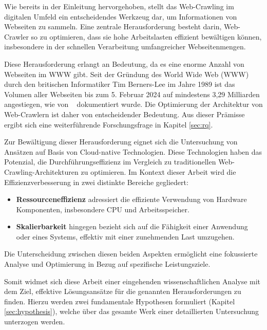 Wie bereits in der Einleitung hervorgehoben, stellt das Web-Crawling im digitalen Umfeld ein entscheidendes Werkzeug dar, um Informationen von Webseiten zu sammeln.
Eine zentrale Herausforderung besteht darin, Web-Crawler so zu optimieren, dass sie hohe Arbeitslasten effizient bewältigen können, insbesondere in der schnellen Verarbeitung umfangreicher Webseitenmengen.



Diese Herausforderung erlangt an Bedeutung, da es eine enorme Anzahl von Webseiten im \ac{WWW} gibt. Seit der Gründung des World Wide Web (\ac{WWW}) durch den britischen Informatiker Tim Berners-Lee im Jahre 1989 ist das Volumen aller Webseiten bis zum 5. Februar 2024 auf mindestens 3,29 Milliarden angestiegen, wie von ~\parencite[vgl.][]{DeKunder2016} dokumentiert wurde. Die Optimierung der Architektur von Web-Crawlern ist daher von entscheidender Bedeutung. Aus dieser Prämisse ergibt sich eine weiterführende Forschungsfrage in Kapitel \ref{sec:rq}.

Zur Bewältigung dieser Herausforderung eignet sich die Untersuchung von Ansätzen auf Basis von Cloud-native Technologien. Diese Technologien haben das Potenzial, die Durchführungseffizienz im Vergleich zu traditionellen Web-Crawling-Architekturen zu optimieren. Im Kontext dieser Arbeit wird die Effizienzverbesserung in zwei distinkte Bereiche gegliedert:

\begin{itemize}
    \item \textbf{Ressourceneffizienz} adressiert die effiziente Verwendung von Hardware Komponenten, insbesondere CPU und Arbeitsspeicher.
    \item \textbf{Skalierbarkeit} hingegen bezieht sich auf die Fähigkeit einer Anwendung oder eines Systems, effektiv mit einer zunehmenden Last umzugehen.
\end{itemize}
Die Unterscheidung zwischen diesen beiden Aspekten ermöglicht eine fokussierte Analyse und Optimierung in Bezug auf spezifische Leistungsziele.

Somit widmet sich diese Arbeit einer eingehenden wissenschaftlichen Analyse mit dem Ziel, effektive Lösungsansätze für die genannten Herausforderungen zu finden. Hierzu werden zwei fundamentale Hypothesen formuliert (Kapitel \ref{sec:hypothesis}), welche über das gesamte Werk einer detaillierten Untersuchung unterzogen werden. 

